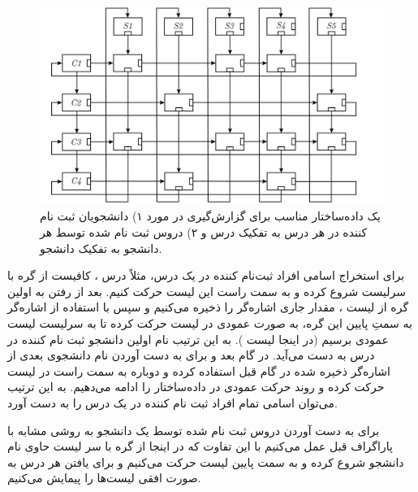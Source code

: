 \begin{figure}
\begin{center}
\includegraphics[scale=0.33]{figs/ch3/custom_ds.pdf}
\caption{%
یک داده‌ساختار مناسب برای گزارش‌گیری در مورد ۱) دانشجویان ثبت نام کننده در هر درس به تفکیک درس و ۲) دروس ثبت نام شده توسط هر دانشجو به تفکیک دانشجو.
}\label{ch3:fig:customDS}
\end{center}
\end{figure}

برای استخراج اسامی افراد ثبت‌نام کننده در یک درس، مثلاً درس {} ، کافیست از گره با سرلیست {} شروع کرده و به سمت راست این لیست حرکت کنیم. بعد از رفتن به اولین گره از لیست {} ، مقدار جاری اشاره‌گر را ذخیره می‌کنیم و سپس با استفاده از اشاره‌گر به سمتِ پایین این گره، به صورت عمودی در لیست حرکت کرده تا به سرلیست لیست عمودی برسیم (در اینجا لیست {}). به این ترتیب نام اولین دانشجو ثبت نام کننده در درس {} به دست می‌‌آید. در گام بعد و برای به دست آوردن نام دانشجوی بعدی از اشاره‌گر ذخیره شده در گام قبل استفاده کرده و دوباره به سمت راست در لیست {} حرکت کرده و روند حرکت عمودی در داده‌ساختار را ادامه می‌دهیم. به این ترتیب می‌توان اسامی تمام افراد ثبت نام کننده در یک درس را به دست آورد.

برای به دست آوردن دروس ثبت نام شده توسط یک دانشجو به روشی مشابه با پاراگراف قبل عمل می‌کنیم با این تفاوت که در اینجا از گره با سر لیست حاوی نام دانشجو شروع کرده و به سمت پایین لیست حرکت می‌کنیم و برای یافتن هر درس به صورت افقی لیست‌ها را پیمایش می‌کنیم.